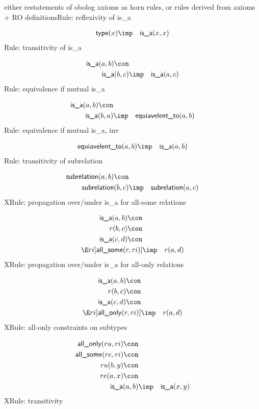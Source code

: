 either restatements of obolog axioms as horn rules, or rules derived from axioms + RO definitionsRule: reflexivity of is\_a

\begin{eqnarray*}
 \pr{type}(x) &\imp & \pr{is\_a}(x, x) 
\end{eqnarray*}
Rule: transitivity of is\_a

\begin{eqnarray*}
 \pr{is\_a}(a, b) \con \\
 \pr{is\_a}(b, c) &\imp & \pr{is\_a}(a, c) 
\end{eqnarray*}
Rule: equivalence if mutual is\_a

\begin{eqnarray*}
 \pr{is\_a}(a, b) \con \\
 \pr{is\_a}(b, a) &\imp & \pr{equiavelent\_to}(a, b) 
\end{eqnarray*}
Rule: equivalence if mutual is\_a, inv

\begin{eqnarray*}
 \pr{equiavelent\_to}(a, b) &\imp & \pr{is\_a}(a, b) 
\end{eqnarray*}
Rule: transitivity of subrelation

\begin{eqnarray*}
 \pr{subrelation}(a, b) \con \\
 \pr{subrelation}(b, c) &\imp & \pr{subrelation}(a, c) 
\end{eqnarray*}
XRule: propagation over/under is\_a for all-some relations

\begin{eqnarray*}
 \pr{is\_a}(a, b) \con \\
r(b, c) \con \\
 \pr{is\_a}(c, d) \con \\
 \E ri[ \pr{all\_some}(r, ri) ]&\imp &r(a, d) 
\end{eqnarray*}
XRule: propagation over/under is\_a for all-only relations

\begin{eqnarray*}
 \pr{is\_a}(a, b) \con \\
r(b, c) \con \\
 \pr{is\_a}(c, d) \con \\
 \E ri[ \pr{all\_only}(r, ri) ]&\imp &r(a, d) 
\end{eqnarray*}
XRule: all-only constraints on subtypes

\begin{eqnarray*}
 \pr{all\_only}(ru, ri) \con \\
 \pr{all\_some}(re, ri) \con \\
ru(b, y) \con \\
re(a, x) \con \\
 \pr{is\_a}(a, b) &\imp & \pr{is\_a}(x, y) 
\end{eqnarray*}
XRule: transitivity


